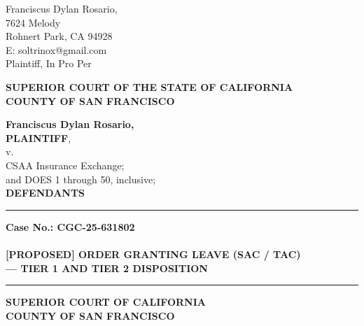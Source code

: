

\nolinenumbers
\begin{singlespace}
Franciscus Dylan Rosario, \\
7624 Melody \\
Rohnert Park, CA 94928 \\
E: soltrinox@gmail.com \\
Plaintiff, In Pro Per \\
\end{singlespace}
\vspace*{9mm}
\begin{tightcenter}
\textbf{SUPERIOR COURT OF THE STATE OF CALIFORNIA} \\
\textbf{COUNTY OF SAN FRANCISCO}
\end{tightcenter}
\vspace*{2.25mm}
\nolinenumbers
\begin{minipage}[t]{3in}
    \raggedright
    \textbf{Franciscus Dylan Rosario,} \\ \textbf{PLAINTIFF}, \\
    \hspace{1cm} v. \\
    \small
    CSAA Insurance Exchange; \\
    and DOES 1 through 50, inclusive; \\
    \normalsize
    \textbf{DEFENDANTS}
    \makebox[3in]{\hrulefill}
\end{minipage}%
\hspace{3mm}
\begin{minipage}[t]{0.5pt}
    \vspace{0pt}
    \rule{0.5pt}{2.0in}
\end{minipage}
\hspace{3mm}
\begin{minipage}[t]{3in}
    \raggedright
    \noindent \textbf{Case No.: CGC-25-631802} \\
    ~\\
    \textbf{[PROPOSED] ORDER GRANTING LEAVE (SAC / TAC)} \\
    \textbf{--- TIER 1 AND TIER 2 DISPOSITION}
\end{minipage}
\vspace*{6mm}
\nolinenumbers
\begin{center}\rule{0.5\linewidth}{0.5pt}\end{center}

\textbf{SUPERIOR COURT OF CALIFORNIA}\\
\textbf{COUNTY OF SAN FRANCISCO}

